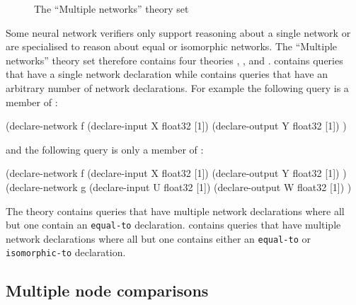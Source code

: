 \begin{figure}[h]
\centering
{}
\caption{The ``Multiple networks'' theory set}
\label{fig:multiple-networks-theory-set}
\end{figure}

Some neural network verifiers only support reasoning about a single network or are specialised to reason about equal or isomorphic networks. The ``Multiple networks'' theory set therefore contains four theories \snet{}, \menet{}, \minet{} and \mnet{}. \snet{} contains queries that have a single network declaration while \mnet{} contains queries that have an arbitrary number of network declarations. For example the following query is a member of \snet{}:

\begin{code}[style=lbnf]
(declare-network f
    (declare-input  X float32 [1])
    (declare-output Y float32 [1])
)
\end{code}

and the following query is only a member of \mnet{}:

\begin{code}[style=lbnf]
(declare-network f
    (declare-input  X float32 [1])
    (declare-output Y float32 [1])
)
(declare-network g
    (declare-input  U float32 [1])
    (declare-output W float32 [1])
)
\end{code}

The theory \menet{} contains queries that have multiple network declarations where all but one contain an \texttt{equal-to} declaration.
\minet{} contains queries that have multiple network declarations where all but one contains either an \texttt{equal-to} or \texttt{isomorphic-to} declaration.


\subsection{Multiple node comparisons}
\label{sec:multi-node-comparisons}

